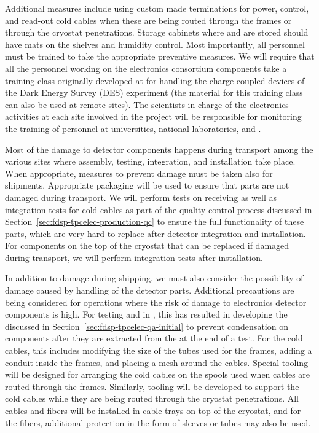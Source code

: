 Additional measures
include using custom made terminations for 
power, control, and read-out cold cables when these
are being routed through the  frames or through the
cryostat penetrations. Storage cabinets where  and
 are stored should have  mats
on the shelves and humidity control. Most importantly, all personnel must be trained to take the appropriate preventive measures. We 
will require that all the personnel working on the  electronics 
consortium components take a training class originally developed 
at  for handling the charge-coupled devices of the Dark Energy Survey (DES) experiment 
(the material for this training class can also be used at remote 
sites). The scientists in charge of the  electronics activities at each site involved in the project will be responsible for monitoring the training of personnel at universities, national laboratories,
and .

Most of the damage to detector components happens during 
transport among the various sites where assembly, testing, integration,
and installation take place. When appropriate, measures to prevent
 damage must be taken also for shipments. Appropriate 
packaging will be used to ensure that parts are not damaged
during transport. We will perform tests on receiving  
 as well as integration tests for cold cables as
part of the quality control process discussed in 
Section~\ref{sec:fdsp-tpcelec-production-qc} to ensure the 
full functionality of these parts, which are very hard to replace 
after detector integration and installation. For  
components on the top of the cryostat that
can be replaced if damaged during transport, we will 
perform integration tests after installation.

In addition to damage during shipping, we must also consider the
possibility of damage caused by handling of the detector parts.
Additional precautions are being considered for operations where
the risk of damage to  electronics detector components is
high. For testing  and  
in \lntwo, this has resulted in developing the
 discussed in Section~\ref{sec:fdsp-tpcelec-qa-initial}
to prevent condensation on components after they are extracted from
the \lntwo at the end of a test. For the cold cables, this 
includes modifying the size of the tubes used for the  frames,
adding a conduit inside the frames, and placing a mesh around 
the cables. Special tooling will be designed for arranging the
cold cables on the spools used when cables are routed through
the  frames. Similarly, tooling will be developed to 
support the cold cables while they are being routed through the 
cryostat penetrations. All cables and fibers will
be installed in cable trays on top of the cryostat, and for the fibers, additional protection in the form of sleeves or tubes 
may also be used. 

